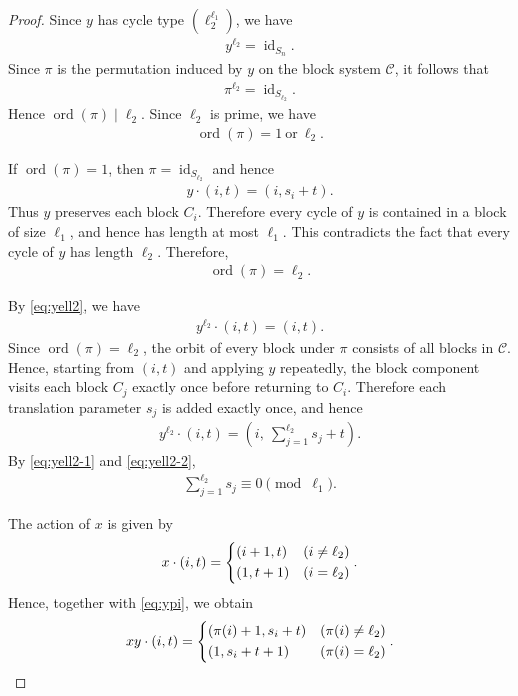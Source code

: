 \documentclass[12pt,reqno]{amsart}
\newcommand{\mcC}{\mathcal{C}}
\DeclareMathOperator{\id}{id}								%
\DeclareMathOperator{\ord}{ord}							%
\theoremstyle{mythmstyle}
\theoremstyle{mydefstyle}
\numberwithin{equation}{section}
\begin{document}
\begin{proof}
Since $y$ has cycle type $(\ell_2^{\ell_1})$, we have
\begin{align}
\label{eq:yell2}
y^{\ell_2}=\id_{S_{n}}.
\end{align}
Since $\pi$ is the permutation induced by $y$ on the block system $\mcC$, it follows that
\begin{align}
\pi^{\ell_2}=\id_{S_{\ell_2}}.
\end{align}
Hence $\ord(\pi)\mid \ell_2$. Since $\ell_2$ is prime, we have
\begin{align}
\ord(\pi) = 1\ \text{or}\ \ell_{2}.
\end{align}

If $\ord(\pi) = 1$, then $\pi = \id_{S_{\ell_{2}}}$ and hence
\begin{align}
y\cdot(i, t) = (i, s_{i}+t).
\end{align}
Thus $y$ preserves each block $C_i$.
Therefore every cycle of $y$ is contained in a block of size $\ell_{1}$,
and hence has length at most $\ell_1$.
This contradicts the fact that every cycle of $y$ has length $\ell_2$.
Therefore,
\begin{align}
\ord(\pi) = \ell_{2}.
\end{align}

By \eqref{eq:yell2}, we have
\begin{align}
\label{eq:yell2-1}
y^{\ell_{2}}\cdot(i, t) = (i, t).
\end{align}
Since $\ord(\pi)=\ell_2$,
the orbit of every block under $\pi$ consists of all blocks in $\mcC$.
Hence, starting from $(i, t)$ and applying $y$ repeatedly,
the block component visits each block $C_{j}$ exactly once before returning to $C_{i}$.
Therefore each translation parameter $s_j$ is added exactly once, and hence
\begin{align}
\label{eq:yell2-2}
y^{\ell_2}\cdot(i,t) = \left(i,\ \sum_{j=1}^{\ell_2}s_j+t\right).
\end{align}
By \eqref{eq:yell2-1} and \eqref{eq:yell2-2},
\begin{align}
\label{eq:sumsi1}
\sum_{j=1}^{\ell_{2}}s_{j} \equiv 0 \pmod{\ell_{1}}.
\end{align}

The action of $x$ is given by
\begin{align}
x\cdot (i, t) =
\begin{dcases}
(i+1, t) & (i \ne \ell_{2}) \\
(1, t+1) & (i = \ell_{2})
\end{dcases}.
\end{align}
Hence, together with \eqref{eq:ypi}, we obtain
\begin{align}
xy \cdot (i, t) = 
\begin{dcases}
(\pi(i)+1, s_{i} + t) & (\pi(i) \ne \ell_{2}) \\
(1, s_{i} + t + 1) & (\pi(i) = \ell_{2})
\end{dcases}.
\end{align}


\end{proof}
\end{document}
